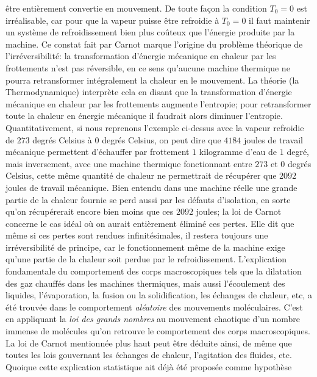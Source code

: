 \^etre enti\`erement convertie en mouvement. De toute fa\c con la condition 
$T_0=0$ est irr\'ealisable, car pour que la vapeur puisse \^etre refroidie
\`a $T_0=0$ il faut maintenir un syst\`eme de refroidissement bien plus
co\^uteux que l'\'energie produite par la machine. Ce constat fait par 
Carnot marque l'origine du probl\`eme th\'eorique de l'irr\'eversibilit\'e: 
la transformation d'\'energie m\'ecanique en chaleur par les frottements 
n'est pas r\'eversible, en ce sens qu'aucune machine thermique ne 
pourra retransformer int\'egralement la chaleur en le mouvement. 
La th\'eorie (la Thermodynamique) interpr\`ete cela en disant que la
transformation d'\'energie m\'ecanique en chaleur par les frottements
augmente l'entropie; pour retransformer toute la chaleur en \'energie
m\'ecanique il faudrait alors diminuer l'entropie. Quanti\-ta\-ti\-ve\-ment, 
si nous reprenons l'exemple ci-dessus avec la vapeur refroidie 
de $273$ degr\'es Celsius \`a $0$ degr\'es Celsius, on peut dire
que $4184$ joules de travail m\'ecanique permettent d'\'echauffer par 
frottement $1$ kilogramme d'eau de $1$ degr\'e, mais inversement, avec 
une machine thermique fonctionnant entre $273$ et $0$ degr\'es Celsius, 
cette m\^eme quantit\'e de chaleur ne permettrait de r\'ecup\'erer que 
$2092$ joules de travail m\'ecanique. Bien entendu dans une 
machine r\'eelle une grande partie de la chaleur fournie se perd aussi
par les d\'efauts d'isolation, en sorte qu'on r\'ecup\'ererait encore bien 
moins que ces $2092$ joules; la loi de Carnot concerne le cas id\'eal o\`u 
on aurait enti\`erement \'elimin\'e ces pertes. Elle dit que m\^eme si ces 
pertes sont rendues infinit\'esimales, il restera toujours une
irr\'eversibilit\'e de principe, car le fonctionnement m\^eme de la machine
exige qu'une partie de la chaleur soit perdue par le refroidissement.
\medskip
L'explication fondamentale du comportement des corps macroscopiques 
tels que la dilatation des gaz chauff\'es dans les machines thermiques, 
mais aussi l'\'ecoulement des liquides, l'\'evaporation, la fusion ou la 
solidification, les \'echanges de chaleur, etc, a \'et\'e trouv\'ee dans 
le comportement {\it al\'eatoire} des mouvements mol\'eculaires. C'est en 
appliquant la {\it loi des grands nombres} au mouvement chaotique d'un 
nombre immense de mol\'ecules qu'on retrouve le comportement des corps 
macroscopiques. La loi de Carnot mentionn\'ee plus haut peut \^etre 
d\'eduite ainsi, de m\^eme que toutes les lois gouvernant les 
\'echanges de chaleur, l'agitation des fluides, etc. Quoique cette 
explication statistique ait d\'ej\`a \'et\'e propos\'ee comme hypoth\`ese 
